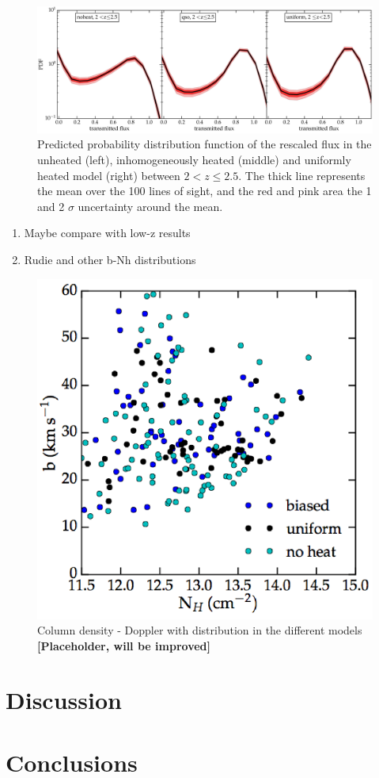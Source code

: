 \documentclass[numberedappendix]{emulateapj}
\newcommand\ALc[1]{{\color{red} \bf #1}} %
\begin{document}
\begin{figure}[h]
\centering
\includegraphics[width = .9\textwidth ]{PDF_predict_allz_100lines}
\caption{Predicted probability distribution function of the rescaled flux in the unheated (left), inhomogeneously heated (middle) and uniformly heated model (right) between $2 <z\leq 2.5$. The thick line represents the mean over the 100 lines of sight, and the red and pink area the 1 and 2 $\sigma$ uncertainty around the mean.  }
\label{fig:fluxPDF}
\end{figure}



\begin{enumerate}
\item Maybe compare with low-z results
\item Rudie and other b-Nh distributions
\end{enumerate}
\begin{figure}
\centering
\includegraphics[width = .45\textwidth ]{b_Nh}
\caption{ Column density - Doppler with distribution in the different models \ALc{[Placeholder, will be improved]}}
\label{fig:b_Nh}
\end{figure}



\section{Discussion}\label{sec:discussion}

\section{Conclusions}\label{sec:conclusion}
\end{document}

